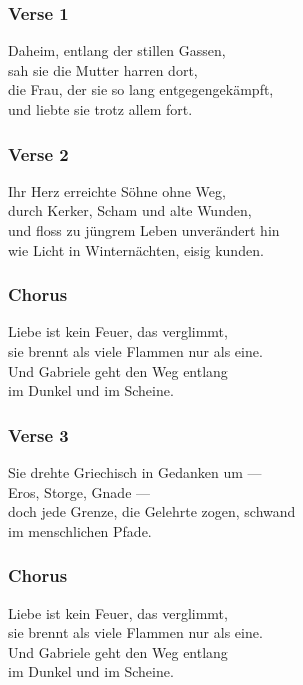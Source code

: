 \subsubsection{Verse 1}\label{verse-1-6}

Daheim, entlang der stillen Gassen,\\
sah sie die Mutter harren dort,\\
die Frau, der sie so lang entgegengekämpft,\\
und liebte sie trotz allem fort.

\subsubsection{Verse 2}\label{verse-2-6}

Ihr Herz erreichte Söhne ohne Weg,\\
durch Kerker, Scham und alte Wunden,\\
und floss zu jüngrem Leben unverändert hin\\
wie Licht in Winternächten, eisig kunden.

\subsubsection{Chorus}\label{chorus-17}

Liebe ist kein Feuer, das verglimmt,\\
sie brennt als viele Flammen nur als eine.\\
Und Gabriele geht den Weg entlang\\
im Dunkel und im Scheine.

\subsubsection{Verse 3}\label{verse-3-3}

Sie drehte Griechisch in Gedanken um ---\\
Eros, Storge, Gnade ---\\
doch jede Grenze, die Gelehrte zogen, schwand\\
im menschlichen Pfade.

\subsubsection{Chorus}\label{chorus-18}

Liebe ist kein Feuer, das verglimmt,\\
sie brennt als viele Flammen nur als eine.\\
Und Gabriele geht den Weg entlang\\
im Dunkel und im Scheine.

